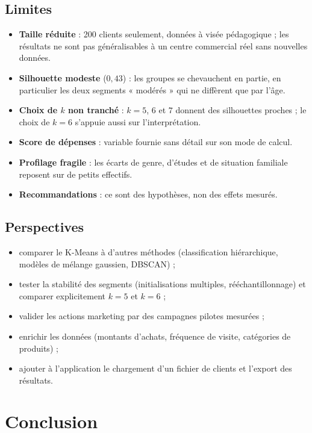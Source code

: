 \documentclass[11pt,a4paper]{article}
\begin{document}
\subsection{Limites}
\begin{itemize}
  \item \textbf{Taille réduite} : 200 clients seulement, données à visée pédagogique ; les résultats ne sont pas généralisables à un centre commercial réel sans nouvelles données.
  \item \textbf{Silhouette modeste} ($0{,}43$) : les groupes se chevauchent en partie, en particulier les deux segments « modérés » qui ne diffèrent que par l'âge.
  \item \textbf{Choix de $k$ non tranché} : $k=5$, $6$ et $7$ donnent des silhouettes proches ; le choix de $k=6$ s'appuie aussi sur l'interprétation.
  \item \textbf{Score de dépenses} : variable fournie sans détail sur son mode de calcul.
  \item \textbf{Profilage fragile} : les écarts de genre, d'études et de situation familiale reposent sur de petits effectifs.
  \item \textbf{Recommandations} : ce sont des hypothèses, non des effets mesurés.
\end{itemize}

\subsection{Perspectives}
\begin{itemize}
  \item comparer le K-Means à d'autres méthodes (classification hiérarchique, modèles de mélange gaussien, DBSCAN) ;
  \item tester la stabilité des segments (initialisations multiples, rééchantillonnage) et comparer explicitement $k=5$ et $k=6$ ;
  \item valider les actions marketing par des campagnes pilotes mesurées ;
  \item enrichir les données (montants d'achats, fréquence de visite, catégories de produits) ;
  \item ajouter à l'application le chargement d'un fichier de clients et l'export des résultats.
\end{itemize}

\section{Conclusion}
\end{document}
